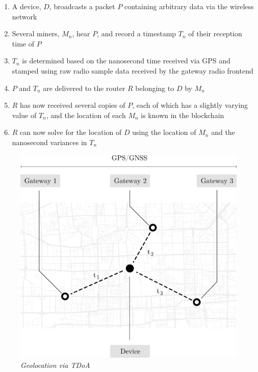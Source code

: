 \documentclass[10pt, nonatbib, nocopyrightspace, reprint]{sigplanconf}
\begin{document}
\begin{enumerate}
        \item A device, $D$, broadcasts a packet $P$ containing arbitrary data via the wireless network
        \item Several miners, $M_n$, hear $P$, and record a timestamp $T_n$ of their reception time of $P$
        \item $T_n$ is determined based on the nanosecond time received via GPS and stamped using raw radio sample data received by the gateway radio frontend
        \item $P$ and $T_n$ are delivered to the router $R$ belonging to $D$ by $M_n$
        \item $R$ has now received several copies of $P$, each of which has a slightly varying value of $T_n$, and the location of each $M_n$ is known in the blockchain
        \item $R$ can now solve for the location of $D$ using the location of $M_n$ and the nanosecond variances in $T_n$
\end{enumerate}

\begin{figure}[H]
    \begin{center}
          \includegraphics[width=\columnwidth]{tdoa.eps}
          \caption{\emph{Geolocation via TDoA}}
          \label{fig:tdoa}
     \end{center}
\end{figure}
\end{document}
